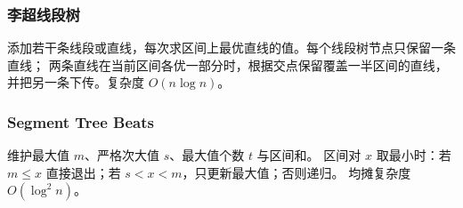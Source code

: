 \subsubsection{李超线段树}
添加若干条线段或直线，每次求区间上最优直线的值。每个线段树节点只保留一条直线；
两条直线在当前区间各优一部分时，根据交点保留覆盖一半区间的直线，并把另一条下传。复杂度 $O(n\log n)$。

\subsubsection{Segment Tree Beats}
维护最大值 $m$、严格次大值 $s$、最大值个数 $t$ 与区间和。
区间对 $x$ 取最小时：若 $m\le x$ 直接退出；若 $s<x<m$，只更新最大值；否则递归。
均摊复杂度 $O(\log^2 n)$。

